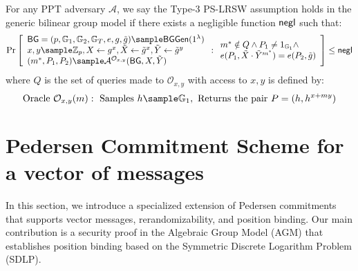 \begin{definition}
For any PPT adversary $\mathcal{A}$, we say the Type-3 PS-LRSW assumption holds in the generic bilinear group model if there exists a negligible function $\mathsf{negl}$ such that:
$$\Pr\left[\begin{array}{l}
    \BG = (p, \G_1, \G_2, \G_T, e, g, \tilde{g}) \sample \BGGen(1^\lambda) \\
    x,y \sample \Z_p, X \gets g^x, \tilde{X} \gets \tilde{g}^x, \tilde{Y} \gets \tilde{g}^y \\
    (m^*, P_1, P_2) \sample \mathcal{A}^{\mathcal{O}_{x,y}}(\BG, X, \tilde{Y})
\end{array} : \begin{array}{l}
    m^* \notin Q \land P_1 \neq 1_{\G_1} \land \\
    e(P_1, \tilde{X} \cdot \tilde{Y}^{m^*}) = e(P_2, \tilde{g})
\end{array}\right] \leq \negl$$
where $Q$ is the set of queries made to $\mathcal{O}_{x,y}$ with access to $x,y$ is defined by:
\[
\text{Oracle }\mathcal{O}_{x,y}(m): \text{ Samples } h \sample \G_1, \text{ Returns the pair } P = (h, h^{x+my})
\]

\end{definition}





% 
% 


























% 
% 


\newpage
\section{Pedersen Commitment Scheme for a vector of messages}\label{sec:commitment}
In this section, we introduce a specialized extension of Pedersen commitments that supports vector messages, rerandomizability, and position binding. Our main contribution is a security proof in the Algebraic Group Model (AGM) that establishes position binding based on the Symmetric Discrete Logarithm Problem (SDLP).

